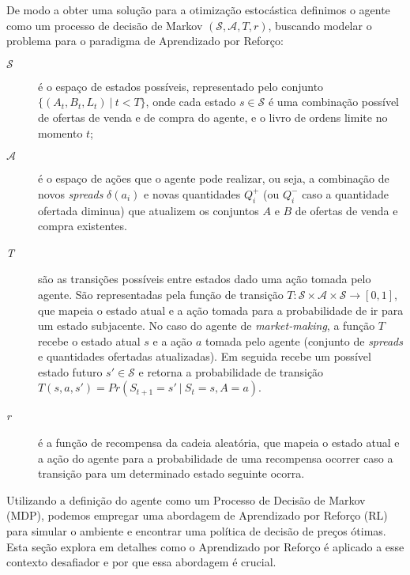 De modo a obter uma solução para a otimização estocástica definimos o agente como um processo de decisão de Markov $(\mathcal{S}, \mathcal{A}, T, r)$, buscando modelar o problema para o paradigma de Aprendizado por Reforço:

\begin{description}
	\item[$\mathcal{S}$] 
	é o espaço de estados possíveis, representado pelo conjunto $\{(A_{t}, B_{t}, L_{t}) \ | \ t < T\}$, onde cada estado $s \in \mathcal{S}$ é uma combinação possível de ofertas de venda e de compra do agente, e o livro de ordens limite no momento $t$;
	\item[$\mathcal{A}$] é o espaço de ações que o agente pode realizar, ou seja, a combinação de novos \textit{spreads} $\delta(a_{i})$ e novas quantidades $Q^{+}_{i}$ (ou $Q^{-}_{i}$ caso a quantidade ofertada diminua) que atualizem os conjuntos $A$ e $B$ de ofertas de venda e compra existentes.
	\item[\textit{T}] são as transições possíveis entre estados dado uma ação tomada pelo agente. São representadas pela função de transição $T :  \mathcal{S} \times \mathcal{A} \times \mathcal{S} \rightarrow [0, 1]$, que mapeia o estado atual e a ação tomada para a probabilidade de ir para um estado subjacente. No caso do agente de \textit{market-making}, a função $T$ recebe o estado atual $s$ e a ação $a$ tomada pelo agente (conjunto de \textit{spreads} e quantidades ofertadas atualizadas). Em seguida recebe um possível estado futuro $s' \in \mathcal{S}$ e retorna a probabilidade de transição $T(s, a, s') = Pr(S_{t+1} = s' \ | \ S_{t} = s, A = a)$.
	\item[\textit{r}] é a função de recompensa da cadeia aleatória, que mapeia o estado atual e a ação do agente para a probabilidade de uma recompensa ocorrer caso a transição para um determinado estado seguinte ocorra.
\end{description}

Utilizando a definição do agente como um Processo de Decisão de Markov (MDP), podemos empregar uma abordagem de Aprendizado por Reforço (RL) para simular o ambiente e encontrar uma política de decisão de preços ótimas. Esta seção explora em detalhes como o Aprendizado por Reforço é aplicado a esse contexto desafiador e por que essa abordagem é crucial.

